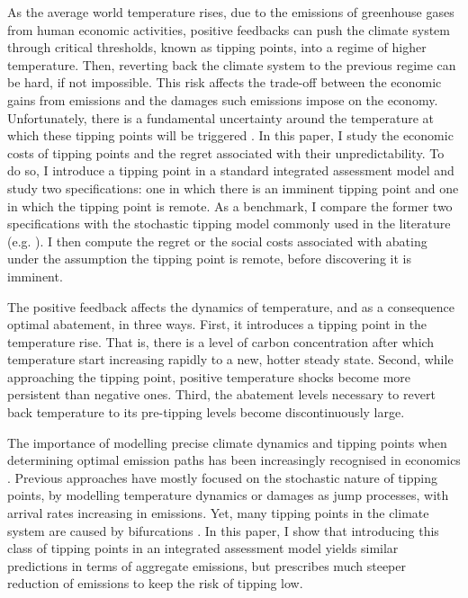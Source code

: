\documentclass[../../main.tex]{subfiles}
\begin{document}
As the average world temperature rises, due to the emissions of greenhouse gases from human economic activities, positive feedbacks can push the climate system through critical thresholds, known as tipping points, into a regime of higher temperature. Then, reverting back the climate system to the previous regime can be hard, if not impossible. This risk affects the trade-off between the economic gains from emissions and the damages such emissions impose on the economy. Unfortunately, there is a fundamental uncertainty around the temperature at which these tipping points will be triggered \citep{ben-yami_uncertainties_2024}. In this paper, I study the economic costs of tipping points and the regret associated with their unpredictability. To do so, I introduce a tipping point in a standard integrated assessment model and study two specifications: one in which there is an imminent tipping point and one in which the tipping point is remote. As a benchmark, I compare the former two specifications with the stochastic tipping model commonly used in the literature (e.g. \citealt{van_der_ploeg_climate_2018,lemoine_ambiguous_2016,hambel_optimal_2021}). I then compute the regret or the social costs associated with abating under the assumption the tipping point is remote, before discovering it is imminent. 


\iffalse
TODO: Literature review.

Talk about \cite{li_economics_2024}.

Talk about \cite{nordhaus_economics_2019} and the other paper you reviewed (forgot the name now.)
\fi


\iffalse

The positive feedback affects the dynamics of temperature, and as a consequence optimal abatement, in three ways. First, it introduces a tipping point in the temperature rise. That is, there is a level of carbon concentration after which temperature start increasing rapidly to a new, hotter steady state. Second, while approaching the tipping point, positive temperature shocks become more persistent than negative ones. Third, the abatement levels necessary to revert back temperature to its pre-tipping levels become discontinuously large. 

The importance of modelling precise climate dynamics and tipping points when determining optimal emission paths has been increasingly recognised in economics \citep{van_den_bremer_risk-adjusted_2021,dietz_economic_2021,dietz_are_2020,taconet_social_2021,lontzek_stochastic_2015}. Previous approaches have mostly focused on the stochastic nature of tipping points, by modelling temperature dynamics \citep{dietz_economic_2021} or damages \citep{lontzek_stochastic_2015} as jump processes, with arrival rates increasing in emissions. Yet, many tipping points in the climate system are caused by bifurcations \citep{ashwin_extreme_2020,ashwin_tipping_2012}. In this paper, I show that introducing this class of tipping points in an integrated assessment model yields similar predictions in terms of aggregate emissions, but prescribes much steeper reduction of emissions to keep the risk of tipping low.
\end{document}
